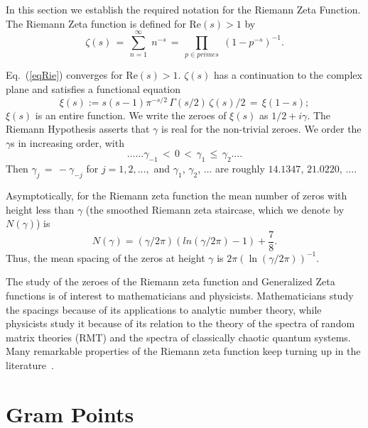 \documentclass[twoside]{article}
\theoremstyle{definition}
\begin{document}
In this section we  establish the required notation for the 
Riemann Zeta Function. 
The Riemann Zeta function is defined for $\mathrm{Re} (s) > 1$ by
\begin{equation}
\zeta ( s ) \, = \, \sum^{\infty}_{n = 1} \; n^{-s} \, = \, \prod_{p \in primes} \;
\left( 1 - p^{-s} \right)^{-1}.
\label{eqRie}
\end{equation}

Eq.~(\ref{eqRie})  converges for $\mathrm{Re} (s) > 1$.  
 $\zeta ( s )$ has a  continuation
to the complex plane and satisfies a functional equation \cite{Riemann(1858),Riemann 1892, Titchmarsh 1986,Edwards(1974)}
\begin{equation}  
\xi(s):=s(s-1) \pi^{-s/2} \, \Gamma (s/2) \, \zeta ( s )/2 \, = \, \xi ( 1 - s );
\label{eq:xifunc}
\end{equation}
$\xi(s)$ is an entire function. We
write the zeroes of $\xi(s)$ as $1/2 + i \gamma$. The Riemann Hypothesis  
asserts that $\gamma$ is real for the non-trivial zeroes.
We order the $\gamma$s in increasing order, with 
\begin{equation}
\ldots \ldots \gamma_{-1} \, < \, 0 \, < \, 
\gamma_1 \, \leq \, \gamma_2 \ldots. 
\end{equation}
Then $\gamma_j \, = \, - \gamma_{-j}$ for $j = 1, 2, \ldots,$ 
and    $\gamma_1$, $\gamma_2$, $\ldots$  are roughly
$14.1347$, $21.0220$, $\ldots$.


Asymptotically, for the Riemann zeta function the mean number of 
zeros with height less than $\gamma$ (the smoothed Riemann zeta staircase, which we denote by $N(\gamma) $)
is~\cite{Edwards(1974)}
\begin{equation}  
N(\gamma) = (\gamma/2\pi)(ln(\gamma/2\pi)-1)+\frac{7}{8}.
\label{eq:Rnumber}
\end{equation}
Thus, the mean spacing of the zeros at height $\gamma$ is 
$2\pi(\ln (\gamma/2\pi))^{-1}$. 

The study of the zeroes of the Riemann zeta function and Generalized 
Zeta functions is of interest to mathematicians and physicists. Mathematicians 
study the spacings because of its applications to analytic number theory, 
while physicists study it because of its  relation 
to the theory of the spectra of random matrix theories (RMT) 
and the spectra of classically chaotic quantum systems. 
Many remarkable properties of the Riemann zeta function keep turning up in the literature~\cite{os6,Matiyasevich}.

\section{\label{sec3}Gram Points}
\end{document}
